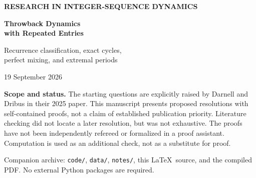 \documentclass[11pt,letterpaper]{article}
\theoremstyle{definition}
\begin{document}
\begin{titlepage}
\thispagestyle{empty}
{\color{Accent}\sffamily\bfseries RESEARCH IN INTEGER-SEQUENCE DYNAMICS\par}
\vspace{0.7in}
{\Huge\bfseries\color{Ink}Throwback Dynamics\\[0.15em]with Repeated Entries\par}
\vspace{0.25in}
{\Large\color{Muted}Recurrence classification, exact cycles,\\perfect mixing, and extremal periods\par}
\vspace{0.3in}
{\large 19 September 2026\par}
\vspace{0.35in}
\begin{abstract}
A throwback move removes the first entry of an infinite queue and reinserts it
at the zero-based position equal to its positive integer value. We resolve
the repeated-entry recurrence question in an occurrence-labeled formulation,
and also identify exactly which numerical values recur. Every occurrence is
recurrent precisely when, for every $m$, at most $m$ entries have value at
most $m$. When this condition fails, the first overloaded initial prefix
identifies the complete recurrent core; the remaining tail never participates.
A sparse backward-parking algorithm extracts this core without simulating the
queue. We then determine every cycle length of the bounded configuration
system, obtain an explicit coprimality criterion for perfect mixing, and prove
that the largest labeled period of a recurrent core of size $r$ is
$\max_{2\le k\le r}k^{r-k+1}$. This gives a throwback interpretation of OEIS
A003320. Catalan and prime-parking-function enumerations, rational generating
functions, a Lambert-$W$ asymptotic, and an exact example of escaped limiting
density complete the analysis. All main statements have proofs; executable
standard-library Python checks accompany the manuscript.
\end{abstract}
\vspace{0.15in}
\begin{resultbox}
\textbf{Scope and status.} The starting questions are explicitly raised by
Darnell and Dribus in their 2025 paper. This manuscript presents proposed
resolutions with self-contained proofs, not a claim of established publication
priority. Literature checking did not locate a later resolution, but was not
exhaustive. The proofs have not been independently refereed or formalized in a
proof assistant. Computation is used as an additional check, not as a substitute
for proof.
\end{resultbox}
\vfill
{\small\color{Muted}Companion archive: \texttt{code/}, \texttt{data/},
\texttt{notes/}, this \LaTeX\ source, and the compiled PDF. No external Python
packages are required.}
\end{titlepage}
{\small\setlength{\parskip}{0pt}\tableofcontents}
\newpage
{}
\end{document}
